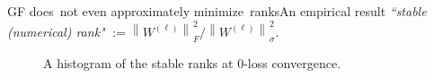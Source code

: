 \documentclass[handout,usenames,dvipsnames]{beamer} %
\newcommand{\norm}[2][]{{\left\|{#2}\right\|_{#1}}}
\begin{document}
\begin{frame}{GF does~not even approximately minimize~ranks}{An empirical result}
    \pause
    \emph{``stable (numerical) rank"} $:= {\norm{W^{(\ell)}}^2_F} / {\norm{W^{(\ell)}}^2_\sigma}$.
    \pause
    \begin{figure}[t]
        \centering
        \caption{A histogram of the stable ranks at $0$-loss convergence.}
    \label{fig:empirical-high-f2s}
    \end{figure}
    

\end{frame}
\end{document}
